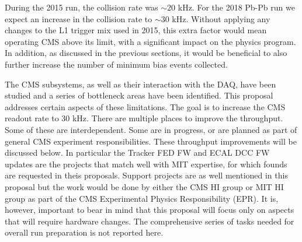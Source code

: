 During the 2015 run, the collision rate was $\sim 20$ kHz. For the 2018 Pb-Pb run we expect an increase in the collision rate to $\sim 30$ kHz. Without applying any changes to the L1 trigger mix used in 2015, this extra factor would mean operating CMS above its limit, with a significant impact on the physics program. In addition, as discussed in the previous sections, it would be beneficial to also further increase the number of minimum bias events collected. 

The CMS subsystems, as well as their interaction with the DAQ, have been studied and a series of bottleneck areas have been identified. This proposal addresses certain aspects of these limitations. The goal is to increase the CMS readout rate to 30 kHz. There are multiple places to improve the throughput. Some of these are interdependent.  Some are in progress, or are planned as part of general CMS experiment responsibilities. These throughput improvements will be discussed below. In particular the Tracker FED FW and ECAL DCC FW updates are the projects that match well with MIT expertise, for which founds are requested in theis proposals. Support projects are as well mentioned in this proposal but the work would be done by either the CMS HI group or MIT HI group as part of the CMS Experimental Physics Responsibility (EPR).
It is, however, important to bear in mind that this proposal will focus only on aspects that will require hardware changes. The comprehensive series of tasks needed for overall run preparation is not reported here. 

